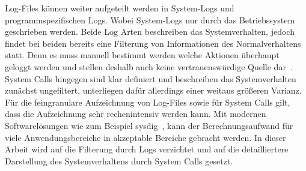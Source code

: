                 Log-Files können weiter aufgeteilt werden in System-Logs und programmspezifischen Logs.
                Wobei System-Logs nur durch das Betriebssystem geschrieben werden.
                Beide Log Arten beschreiben das Systemverhalten, jedoch findet bei beiden bereits eine Filterung von Informationen des Normalverhaltens statt.%
                Denn es muss manuell bestimmt werden welche Aktionen überhaupt geloggt werden und stellen deshalb auch keine vertrauenswürdige Quelle dar~\cite{SEMANTICSCREECH2014}.
                System Calls hingegen sind klar definiert und beschreiben das Systemverhalten zunächst ungefiltert, unterliegen dafür allerdings einer weitaus größeren Varianz.~\cite{HIDSSURVEY2019bridges}
                Für die feingranulare Aufzeichnung von Log-Files sowie für System Calls gilt, dass die Aufzeichnung sehr rechenintensiv werden kann.
                Mit modernen Softwarelösungen wie zum Beispiel sysdig~\cite{SYSDIG}, kann der Berechnungsaufwand für viele Anwendungsbereiche in akzeptable Bereiche gebracht werden.
                In dieser Arbeit wird auf die Filterung durch Logs verzichtet und auf die detailliertere Darstellung des Systemverhaltens durch System Calls gesetzt.


